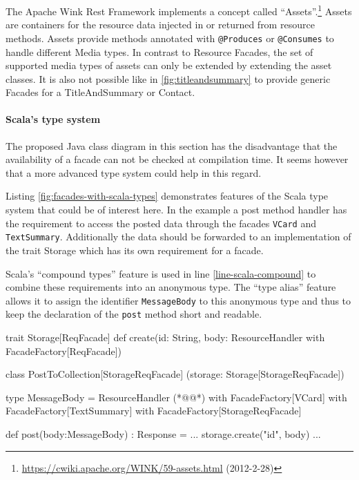 \documentclass[11pt,a4paper,headsepline,twoside]{scrartcl}		%
\newcommand{\citeurl}[2]{\url{#1} (#2)}
\begin{document}
The Apache Wink Rest Framework implements a concept called
``Assets''.\footnote{\citeurl{https://cwiki.apache.org/WINK/59-assets.html}{2012-2-28}}
Assets are containers for the resource data injected in or returned from
resource methods. Assets provide methods annotated with \lstinline:@Produces: or
\lstinline:@Consumes: to handle different Media types. In contrast to Resource
Facades, the set of supported media types of assets can only be extended by
extending the asset classes. It is also not possible like in
\autoref{fig:titleandsummary} to provide generic Facades for a TitleAndSummary
or Contact.

\paragraph{Scala's type system}
The proposed Java class diagram in this section has the disadvantage that the
availability of a facade can not be checked at compilation time. It seems
however that a more advanced type system could help in this regard.

Listing \ref{fig:facades-with-scala-types} demonstrates features of the Scala
type system \cite{Odersky2011} that could be of interest here. In the example a
post method handler has the requirement to access the posted data through the
facades \lstinline:VCard: and \lstinline:TextSummary:. Additionally the data
should be forwarded to an implementation of the trait Storage which has its own
requirement for a facade.

Scala's ``compound types'' feature is used in line \ref{line-scala-compound} to
combine these requirements into an anonymous type. The ``type alias'' feature
allows it to assign the identifier \lstinline:MessageBody: to this anonymous
type and thus to keep the declaration of the \lstinline:post: method short and
readable.

\begin{javalisting}[label=fig:facades-with-scala-types,
                   numbers=left,
                   escapeinside={(*@}{@*)},
                   caption={Implementing the facades approach with Scala's type system}]
trait Storage[ReqFacade] {
 def create(id: String,
            body: ResourceHandler
                  with FacadeFactory[ReqFacade])
}

class PostToCollection[StorageReqFacade]
            (storage: Storage[StorageReqFacade]) {
 type MessageBody = ResourceHandler (*@\label{line-scala-compound}@*)
                    with FacadeFactory[VCard] 
                    with FacadeFactory[TextSummary]
                    with FacadeFactory[StorageReqFacade]
  
 def post(body:MessageBody) : Response = {
  ...
  storage.create("id", body)
  ...
 }
}
\end{javalisting}
\end{document}
